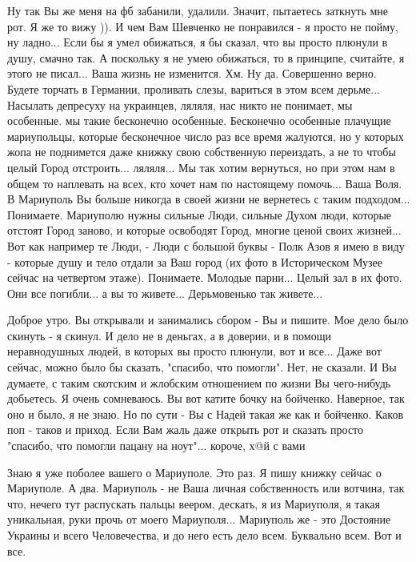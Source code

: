  
 
 
 
 

Ну так Вы же меня на фб забанили, удалили. Значит, пытаетесь заткнуть мне рот.
Я же то вижу )). И чем Вам Шевченко не понравился - я просто не пойму, ну
ладно... Если бы я умел обижаться, я бы сказал, что вы просто плюнули в душу,
смачно так. А поскольку я не умею обижаться, то в принципе, считайте, я этого
не писал... Ваша жизнь не изменится. Хм. Ну да. Совершенно верно. Будете
торчать в Германии, проливать слезы, вариться в этом всем дерьме... Насылать
депресуху на украинцев, ляляля, нас никто не понимает, мы особенные. мы такие
бесконечно особенные. Бесконечно особенные плачущие мариупольцы, которые бесконечное число раз 
все время жалуются, но у которых жопа не поднимется даже книжку свою собственную переиздать, а не то чтобы целый 
Город отстроить... ляляля... 
Мы так хотим вернуться, но при этом нам в общем то наплевать на всех, кто хочет нам по
настоящему помочь... Ваша Воля. В Мариуполь Вы больше никогда в своей жизни не
вернетесь с таким подходом... Понимаете. Мариуполю нужны сильные Люди, сильные
Духом люди, которые отстоят Город заново, и которые освободят Город, многие
ценой своих жизней... Вот как например те Люди, - Люди с большой буквы - Полк Азов я имею в виду -
которые душу и тело отдали за Ваш город (их фото в Историческом Музее сейчас на
четвертом этаже). Понимаете. Молодые парни... Целый зал в их фото. Они 
все погибли... а вы то живете... Дерьмовенько так живете...

Доброе утро. Вы открывали и занимались сбором - Вы и пишите. Мое дело было
скинуть - я скинул.  И дело не в деньгах, а в доверии, и в помощи неравнодушных
людей, в которых вы просто плюнули, вот и все... Даже вот сейчас, можно было бы
сказать, "спасибо, что помогли". Нет, не сказали. И Вы думаете, с таким
скотским и жлобским отношением по жизни Вы чего-нибудь добьетесь. Я очень
сомневаюсь. Вы вот катите бочку на бойченко. Наверное, так оно и было, я не
знаю. Но по сути - Вы с Надей такая же как и бойченко. Каков поп - таков и
приход. Если Вам жаль даже открыть рот и сказать просто "спасибо, что помогли
пацану на ноут"... короче, х@й с вами

Знаю я уже поболее вашего о Мариуполе. Это раз. Я пишу книжку сейчас о
Мариуполе. А два. Мариуполь - не Ваша личная собственность или вотчина, так
что, нечего тут распускать пальцы веером, дескать, я из Мариуполя, я такая
уникальная, руки прочь от моего Мариуполя...  Мариуполь же - это Достояние
Украины и всего Человечества, и до него есть дело всем. Буквально всем. Вот и
все.

